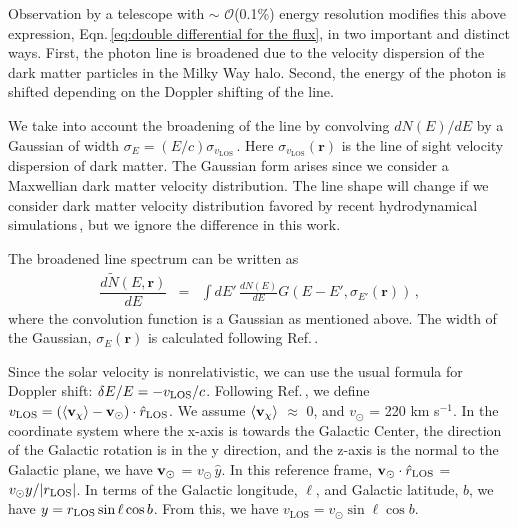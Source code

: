 \documentclass[aps,prd,10pt,twocolumn,superscriptaddress,showpacs]{revtex4-1}
\newcommand{\br}[0]{\mathbf{r}}
\newcommand{\los}[0]{\mathrm{LOS}}
\begin{document}
Observation by a telescope with $\sim$ $\mathcal{O}$(0.1\%) energy resolution modifies this above expression, Eqn.\,\ref{eq:double differential for the flux}, in two important and distinct ways.  First, the photon line is broadened due to the velocity dispersion of the dark matter particles in the Milky Way halo.  Second, the energy of the photon is shifted depending on the Doppler shifting of the line.  

We take into account the broadening of the line by convolving $dN(E)/dE$ by a Gaussian of width
$\sigma_E = (E/c) \sigma_{v_\los}$\,\cite{speckhard2016}.  Here $\sigma_{v_\los}(\br)$ 
is the line of sight velocity dispersion of dark matter.  The Gaussian form arises 
since we consider a Maxwellian dark matter velocity distribution.  The line shape will change if we 
consider dark matter velocity distribution favored by recent hydrodynamical simulations\,\cite{Bozorgnia:2016ogo,Sloane:2016kyi,Kelso:2016qqj}, 
but we ignore the difference in this work.  

The broadened line spectrum can be written as 
\begin{eqnarray}
	\dfrac{d \tilde{N} (E, \br)}{dE} &=& \int dE' \, \frac{dN(E)}{dE}  G(E - E', \sigma_{E'} (\br)) \, ,
\label{eq:formula for modified dNdE}
\end{eqnarray}
where the convolution function is a Gaussian as mentioned above.  The width of the Gaussian,
$\sigma_E(\br)$ is calculated following Ref.\,\cite{speckhard2016}.

Since the solar velocity is nonrelativistic, we can use the usual formula for Doppler shift: $\delta
E/E = - v_{\rm LOS}/c$.  Following Ref.\,\cite{speckhard2016}, we define $v_{\rm LOS} = (\langle
{\bf v}_\chi \rangle - {\bf v}_\odot) \cdot \hat{r}_{\rm LOS}$.  We assume $\langle {\bf v}_\chi
\rangle$ $\approx$ 0, and $v_\odot$ = 220 km s$^{-1}$.  In the coordinate system where the x-axis is
towards the Galactic Center, the direction of the Galactic rotation is in the y direction, and the
z-axis is the normal to the Galactic plane, we have ${\bf v}_\odot$ = $v_\odot \, \hat{y}$.  In this
reference frame, ${\bf v}_\odot \cdot \hat{r}_{\rm LOS}$ = $v_\odot y / |r_{\rm LOS}|$.  In terms of
the Galactic longitude, $\ell$, and Galactic latitude, $b$, we have $y = r_{\rm LOS} \, {\rm sin} \,
\ell \, {\rm cos} \, b$.  From this, we have $v_\los = v_\odot \sin \ell\cos b$.
\end{document}
